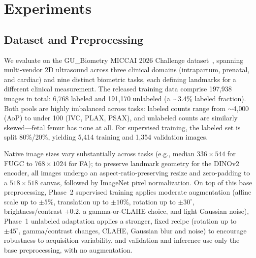 \documentclass[runningheads]{llncs}
\begin{document}
\section{Experiments}
\subsection{Dataset and Preprocessing}
We evaluate on the GU\_Biometry MICCAI 2026 Challenge dataset~\cite{gu_biometry}, spanning multi-vendor 2D ultrasound across three clinical domains (intrapartum, prenatal, and cardiac) and nine distinct biometric tasks, each defining landmarks for a different clinical measurement. The released training data comprise 197{,}938 images in total: 6{,}768 labeled and 191{,}170 unlabeled (a $\sim$3.4\% labeled fraction). Both pools are highly imbalanced across tasks: labeled counts range from $\sim$4{,}000 (AoP) to under 100 (IVC, PLAX, PSAX), and unlabeled counts are similarly skewed---fetal femur has none at all. For supervised training, the labeled set is split 80\%/20\%, yielding 5{,}414 training and 1{,}354 validation images.

Native image sizes vary substantially across tasks (e.g., median $336\times544$ for FUGC to $768\times1024$ for FA); to preserve landmark geometry for the DINOv2 encoder, all images undergo an aspect-ratio-preserving resize and zero-padding to a $518\times518$ canvas, followed by ImageNet pixel normalization. On top of this base preprocessing, Phase~2 supervised training applies moderate augmentation (affine scale up to $\pm5\%$, translation up to $\pm10\%$, rotation up to $\pm30^\circ$, brightness/contrast $\pm0.2$, a gamma-or-CLAHE choice, and light Gaussian noise), Phase~1 unlabeled adaptation applies a stronger, fixed recipe (rotation up to $\pm45^\circ$, gamma/contrast changes, CLAHE, Gaussian blur and noise) to encourage robustness to acquisition variability, and validation and inference use only the base preprocessing, with no augmentation.
\end{document}

